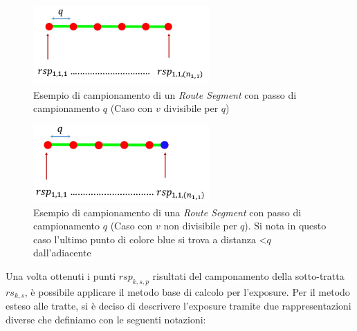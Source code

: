 \begin{figure}[h]
	\centering
\includegraphics[width=0.6\textwidth]{images/routes3}
\caption{Esempio di campionamento di un \textit{Route Segment} con passo di campionamento $q$ (Caso con $v$ divisibile per $q$) }
\label{img:campionamento}
\end{figure}

\begin{figure}[h]
	\centering
\includegraphics[width=0.6\textwidth]{images/routes4}
\caption{Esempio di campionamento di una \textit{Route Segment} con passo di campionamento $q$ (Caso con $v$ non divisibile per $q$). Si nota in questo caso l'ultimo punto di colore blue si trova a distanza <$q$ dall'adiacente }
\label{img:campionamento_2}
\end{figure}

\newpage
\noindent Una volta ottenuti i punti $rsp_{k,s,p}$ risultati del camponamento della sotto-tratta $rs_{k,s}$, è possibile applicare il metodo base di calcolo per l'exposure. Per il metodo esteso alle tratte, si è deciso di descrivere l'exposure tramite due rappresentazioni diverse che definiamo con le seguenti notazioni:

